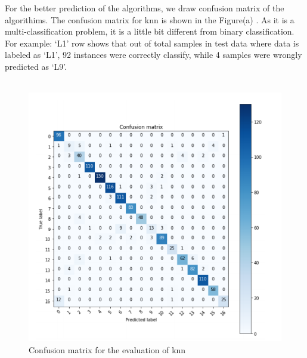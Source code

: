 For the better prediction of the algorithms, we draw confusion matrix of the algorithims. The confusion matrix for knn is shown in the Figure(a) . As it is a multi-classification problem, it is a little bit different from binary classification. For example: ‘L1’ row shows that out of total samples in test data where data is labeled as ‘L1’, 92 instances were correctly classify, while 4 samples were wrongly predicted as ‘L9’.
\\\\
\begin{figure}[h]

  		\centering
    		\includegraphics[scale=0.7]{./Figures/cm}
\caption{Confusion matrix for the evaluation of knn}
\label{fig:6}
 		\end{figure}


